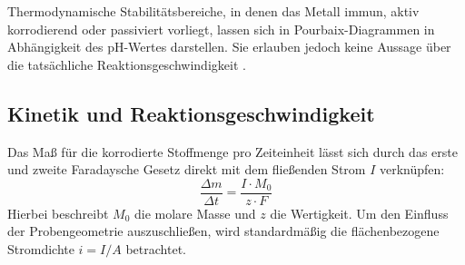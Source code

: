 \documentclass[11pt,a4paper]{article}
\numberwithin{equation}{section}
\begin{document}
\noindent Thermodynamische Stabilitätsbereiche, in denen das Metall immun, aktiv korrodierend oder passiviert vorliegt, lassen sich in Pourbaix-Diagrammen in Abhängigkeit des pH-Wertes darstellen. Sie erlauben jedoch keine Aussage über die tatsächliche Reaktionsgeschwindigkeit \cite{barthelgrenzen}.

\subsection{Kinetik und Reaktionsgeschwindigkeit}
Das Maß für die korrodierte Stoffmenge pro Zeiteinheit lässt sich durch das erste und zweite Faradaysche Gesetz \cite{lupke1899faradaysche} direkt mit dem fließenden Strom $I$ verknüpfen:
\begin{equation}
    \frac{\Delta m}{\Delta t} = \frac{I \cdot M_0}{z \cdot F}
    \label{eq:faraday}
\end{equation}
Hierbei beschreibt $M_0$ die molare Masse und $z$ die Wertigkeit. Um den Einfluss der Probengeometrie auszuschließen, wird standardmäßig die flächenbezogene Stromdichte $i = I/A$ betrachtet.
\end{document}
